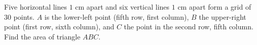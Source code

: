 Five horizontal lines $1$ cm apart and six vertical lines $1$ cm apart form a grid of $30$ points. $A$ is the lower-left point (fifth row, first column), $B$ the upper-right point (first row, sixth column), and $C$ the point in the second row, fifth column. Find the area of triangle $ABC$.
